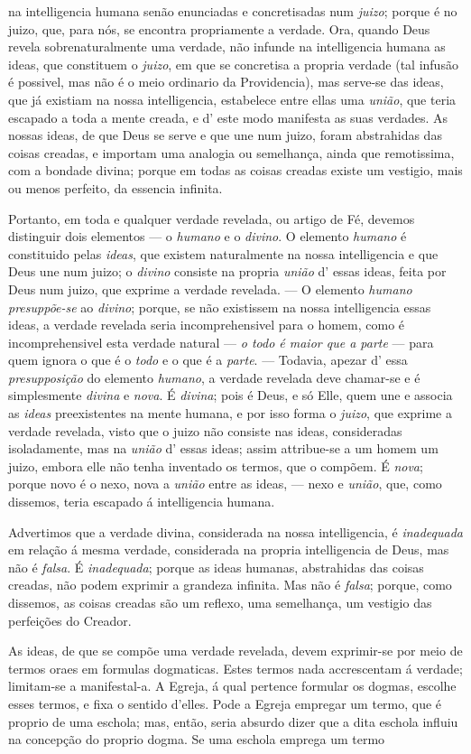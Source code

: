 na intelligencia humana senão enunciadas e concretisadas num \emph{juizo}; porque é no juizo, que, para nós, se encontra propriamente a verdade. Ora, quando Deus revela sobrenaturalmente uma verdade, não infunde na intelligencia humana as ideas, que constituem o \emph{juizo}, em que se concretisa a propria verdade (tal infusão é possivel, mas não é o meio ordinario da Providencia), mas serve-se das ideas, que já existiam na nossa intelligencia, estabelece entre ellas uma \emph{união}, que teria escapado a toda a mente creada, e d' este modo manifesta as suas verdades. As nossas ideas, de que Deus se serve e que une num juizo, foram abstrahidas das coisas creadas, e importam uma analogia ou semelhança, ainda que remotissima, com a bondade divina; porque em todas as coisas creadas existe um vestigio, mais ou menos perfeito, da essencia infinita.\par Portanto, em toda e qualquer verdade revelada, ou artigo de Fé, devemos distinguir dois elementos --- o \emph{humano} e o \emph{divino}. O elemento \emph{humano} é constituido pelas \emph{ideas}, que existem naturalmente na nossa intelligencia e que Deus une num juizo; o \emph{divino} consiste na propria \emph{união} d' essas ideas, feita por Deus num juizo, que exprime a verdade revelada. --- O elemento \emph{humano presuppõe-se} ao \emph{divino}; porque, se não existissem na nossa intelligencia essas ideas, a verdade revelada seria incomprehensivel para o homem, como é incomprehensivel esta verdade natural --- \emph{o todo é maior que a parte} --- para quem ignora o que é o \emph{todo} e o que é a \emph{parte}. --- Todavia, apezar d' essa \emph{presupposição} do elemento \emph{humano}, a verdade revelada deve chamar-se e é simplesmente \emph{divina} e \emph{nova}. É \emph{divina}; pois é Deus, e só Elle, quem une e associa as \emph{ideas} preexistentes na mente humana, e por isso forma o \emph{juizo}, que exprime a verdade revelada, visto que o juizo não consiste nas ideas, consideradas isoladamente, mas na \emph{união} d' essas ideas; assim attribue-se a um homem um juizo, embora elle não tenha inventado os termos, que o compõem. É \emph{nova}; porque novo é o nexo, nova a \emph{união} entre as ideas, --- nexo e \emph{união}, que, como dissemos, teria escapado á intelligencia humana.\par Advertimos que a verdade divina, considerada na nossa intelligencia, é \emph{inadequada} em relação á mesma verdade, considerada na propria intelligencia de Deus, mas não é \emph{falsa}. É \emph{inadequada}; porque as ideas humanas, abstrahidas das coisas creadas, não podem exprimir a grandeza infinita. Mas não é \emph{falsa}; porque, como dissemos, as coisas creadas são um reflexo, uma semelhança, um vestigio das perfeições do Creador.\par As ideas, de que se compõe uma verdade revelada, devem exprimir-se por meio de termos oraes em formulas dogmaticas. Estes termos nada accrescentam á verdade; limitam-se a manifestal-a. A Egreja, á qual pertence formular os dogmas, escolhe esses termos, e fixa o sentido d'elles. Pode a Egreja empregar um termo, que é proprio de uma eschola; mas, então, seria absurdo dizer que a dita eschola influiu na concepção do proprio dogma. Se uma eschola emprega um termo 